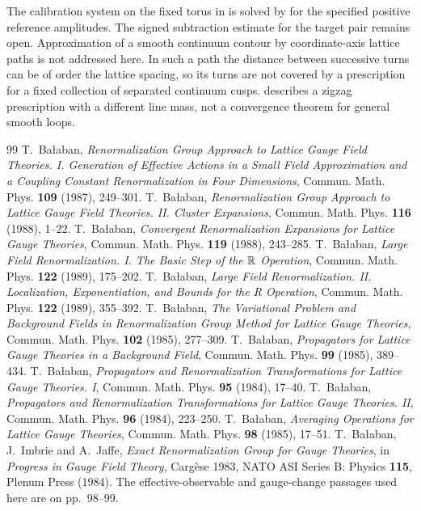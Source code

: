 \documentclass[11pt]{preprint}
\numberwithin{equation}{section}
\begin{document}
The calibration system on the fixed torus in  is solved by  for the specified positive reference amplitudes. The signed subtraction estimate for the target pair remains open. Approximation of a smooth continuum contour by coordinate-axis lattice paths is not addressed here. In such a path the distance between successive turns can be of order the lattice spacing, so its turns are not covered by a prescription for a fixed collection of separated continuum cusps. \cite[Section~IV.B, eqs.~(51)--(52), footnote~5]{Green} describes a zigzag prescription with a different line mass, not a convergence theorem for general smooth loops.

\begin{thebibliography}{99}
 T.~Ba{\l}aban,
\emph{Renormalization Group Approach to Lattice Gauge Field Theories. I. Generation of Effective Actions in a Small Field Approximation and a Coupling Constant Renormalization in Four Dimensions}, Commun. Math. Phys. \textbf{109} (1987), 249--301.
 T.~Ba{\l}aban,
\emph{Renormalization Group Approach to Lattice Gauge Field Theories. II. Cluster Expansions}, Commun. Math. Phys. \textbf{116} (1988), 1--22.
 T.~Ba{\l}aban,
\emph{Convergent Renormalization Expansions for Lattice Gauge Theories}, Commun. Math. Phys. \textbf{119} (1988), 243--285.
 T.~Ba{\l}aban,
\emph{Large Field Renormalization. I. The Basic Step of the ${\mathbb R}$ Operation}, Commun. Math. Phys. \textbf{122} (1989), 175--202.
 T.~Ba{\l}aban,
\emph{Large Field Renormalization. II. Localization, Exponentiation, and Bounds for the R Operation}, Commun. Math. Phys. \textbf{122} (1989), 355--392.
 T.~Ba{\l}aban,
\emph{The Variational Problem and Background Fields in Renormalization Group Method for Lattice Gauge Theories}, Commun. Math. Phys. \textbf{102} (1985), 277--309.
 T.~Ba{\l}aban,
\emph{Propagators for Lattice Gauge Theories in a Background Field}, Commun. Math. Phys. \textbf{99} (1985), 389--434.
 T.~Ba{\l}aban,
\emph{Propagators and Renormalization Transformations for Lattice Gauge Theories. I}, Commun. Math. Phys. \textbf{95} (1984), 17--40.
 T.~Ba{\l}aban,
\emph{Propagators and Renormalization Transformations for Lattice Gauge Theories. II}, Commun. Math. Phys. \textbf{96} (1984), 223--250.
 T.~Ba{\l}aban,
\emph{Averaging Operations for Lattice Gauge Theories}, Commun. Math. Phys. \textbf{98} (1985), 17--51.
 T.~Ba{\l}aban, J.~Imbrie and A.~Jaffe,
\emph{Exact Renormalization Group for Gauge Theories}, in \emph{Progress in Gauge Field Theory}, Carg\`ese 1983, NATO ASI Series B: Physics \textbf{115}, Plenum Press (1984). The effective-observable and gauge-change passages used here are on pp.~98--99.

\end{thebibliography}
\end{document}
